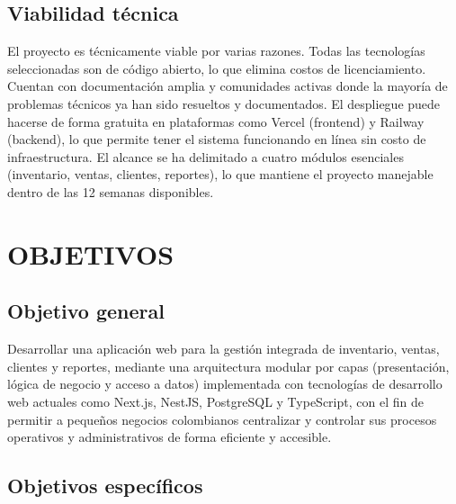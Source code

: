 \documentclass[spanish]{ieee_upb}
\begin{document}
\subsection{Viabilidad técnica}

El proyecto es técnicamente viable por varias razones. Todas las tecnologías seleccionadas son de código abierto, lo que elimina costos de licenciamiento. Cuentan con documentación amplia y comunidades activas donde la mayoría de problemas técnicos ya han sido resueltos y documentados. El despliegue puede hacerse de forma gratuita en plataformas como Vercel (frontend) y Railway (backend), lo que permite tener el sistema funcionando en línea sin costo de infraestructura. El alcance se ha delimitado a cuatro módulos esenciales (inventario, ventas, clientes, reportes), lo que mantiene el proyecto manejable dentro de las 12 semanas disponibles.


\newpage
\section{OBJETIVOS}

\subsection{Objetivo general}

Desarrollar una aplicación web para la gestión integrada de inventario, ventas, clientes y reportes, mediante una arquitectura modular por capas (presentación, lógica de negocio y acceso a datos) implementada con tecnologías de desarrollo web actuales como Next.js, NestJS, PostgreSQL y TypeScript, con el fin de permitir a pequeños negocios colombianos centralizar y controlar sus procesos operativos y administrativos de forma eficiente y accesible.

\subsection{Objetivos específicos}
\end{document}
